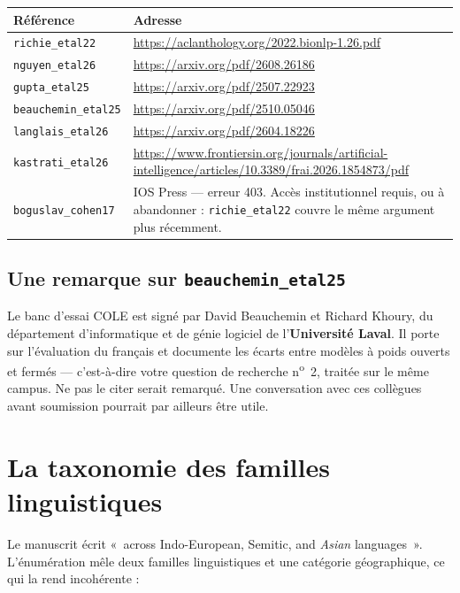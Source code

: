 \documentclass[11pt,a4paper]{article}
\newcommand{\cle}[1]{\texttt{\small #1}}
\begin{document}
\begin{center}
\begin{tabular}{@{}p{3.6cm}p{11.2cm}@{}}
\toprule
\textbf{Référence} & \textbf{Adresse} \\
\midrule
\cle{richie\_etal22} & \url{https://aclanthology.org/2022.bionlp-1.26.pdf} \\
\cle{nguyen\_etal26} & \url{https://arxiv.org/pdf/2608.26186} \\
\cle{gupta\_etal25} & \url{https://arxiv.org/pdf/2507.22923} \\
\cle{beauchemin\_etal25} & \url{https://arxiv.org/pdf/2510.05046} \\
\cle{langlais\_etal26} & \url{https://arxiv.org/pdf/2604.18226} \\
\cle{kastrati\_etal26} & \url{https://www.frontiersin.org/journals/artificial-intelligence/articles/10.3389/frai.2026.1854873/pdf} \\
\midrule
\cle{boguslav\_cohen17} & IOS Press --- erreur 403. Accès institutionnel requis,
ou à abandonner : \cle{richie\_etal22} couvre le même argument plus récemment. \\
\bottomrule
\end{tabular}
\end{center}

\subsection*{Une remarque sur \cle{beauchemin\_etal25}}

Le banc d'essai COLE est signé par David Beauchemin et Richard Khoury, du
département d'informatique et de génie logiciel de l'\textbf{Université Laval}.
Il porte sur l'évaluation du français et documente les écarts entre modèles à
poids ouverts et fermés --- c'est-à-dire votre question de recherche n\textsuperscript{o}~2,
traitée sur le même campus. Ne pas le citer serait remarqué. Une conversation
avec ces collègues avant soumission pourrait par ailleurs être utile.

\section{La taxonomie des familles linguistiques}
\label{sec:taxo}

Le manuscrit écrit «~across Indo-European, Semitic, and \emph{Asian}
languages~». L'énumération mêle deux familles linguistiques et une catégorie
géographique, ce qui la rend incohérente :
\end{document}
